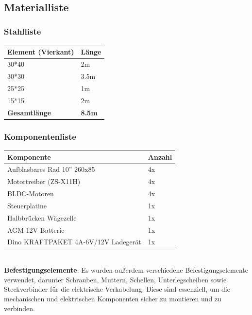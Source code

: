 \documentclass[ngerman,12pt,a4paper]{article}
\begin{document}
		\subsection{Materialliste} %
		
			\subsubsection{Stahlliste}
		
			\begin{tabular}{| l | l |}  
				\hline  
				\textbf{Element (Vierkant)} & \textbf{Länge} \\   
				\hline  
				30*40 & 2m \\  
				\hline  
				30*30 & 3.5m \\  
				\hline  
				25*25 & 1m \\  
				\hline  
				15*15 & 2m \\ 
				\hline  
				\textbf{Gesamtlänge} & \textbf{8.5m} \\ 
				\hline
			\end{tabular}
			
			\subsubsection{Komponentenliste}
		
			\begin{tabular}{| l | l |}  
				\hline  
				\textbf{Komponente} & \textbf{Anzahl} \\   
				\hline  
				Aufblasbares Rad 10'' 260x85 & 4x \\  
				\hline  
				Motortreiber (ZS-X11H) & 4x \\  
				\hline  
				BLDC-Motoren & 4x \\  
				\hline  
				Steuerplatine & 1x \\ 
				\hline  
				Halbbrücken Wägezelle & 1x \\ 
				\hline  
				AGM 12V Batterie & 1x \\ 
				\hline  
				Dino KRAFTPAKET 4A-6V/12V Ladegerät & 1x \\ 
				\hline  
			\end{tabular} \\[0.74cm]
			\textbf{Befestigungselemente}: Es wurden außerdem verschiedene Befestigungselemente verwendet, darunter Schrauben, Muttern, Schellen, Unterlegscheiben sowie Steckverbinder für die elektrische Verkabelung. Diese sind essenziell, um die mechanischen und elektrischen Komponenten sicher zu montieren und zu verbinden.
	\newpage
\end{document}
